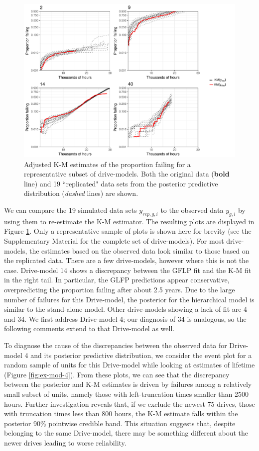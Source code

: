 \documentclass[12pt]{article}
\begin{document}
\begin{figure}[H]
\includegraphics[width=\textwidth]{ppcheck-sample}
\caption{Adjusted K-M estimates of the proportion failing for a representative subset of drive-models. Both the original data (\textbf{bold} line) and 19 ``replicated" data sets from the posterior predictive distribution (\textit{dashed} lines) are shown.}
\label{fig:post-pred-KM}
\end{figure}

We can compare the 19 simulated data sets $y_{rep,g, i}$ to the observed data $y_{g,i}$ by using them to re-estimate the K-M estimator. The resulting plots are displayed in Figure \ref{fig:post-pred-KM}. Only a representative sample of plots is shown here for brevity (see the Supplementary Material for the complete set of drive-models).  For most drive-models, the estimates based on the observed data look similar to those based on the replicated data.  There are a few drive-models, however where this is not the case. Drive-model 14 shows a discrepancy between the GFLP fit and the K-M fit in the right tail. In particular, the GLFP predictions appear conservative, overpredicting the proportion failing after about 2.5 years. Due to the large number of failures for this Drive-model, the posterior for the hierarchical model is similar to the stand-alone model. Other drive-models showing a lack of fit are 4 and 34. We first address Drive-model 4; our diagnosis of 34 is analogous, so the following comments extend to that Drive-model as well.


To diagnose the cause of the discrepancies between the observed data for Drive-model 4 and its posterior predictive distribution, we consider the event plot for a random sample of units for this Drive-model while looking at estimates of lifetime (Figure \ref{fig:ex-mod-4}). From these plots, we can see that the discrepancy between the posterior and K-M estimates is driven by failures among a relatively small subset of units, namely those with left-truncation times smaller than 2500 hours. Further investigation reveals that, if we exclude the newest 75 drives, those with truncation times less than 800 hours, the K-M estimate falls within the posterior 90\% pointwise credible band. This situation suggests that, despite belonging to the same Drive-model, there may be something different about the newer drives leading to worse reliability. 
\end{document}
